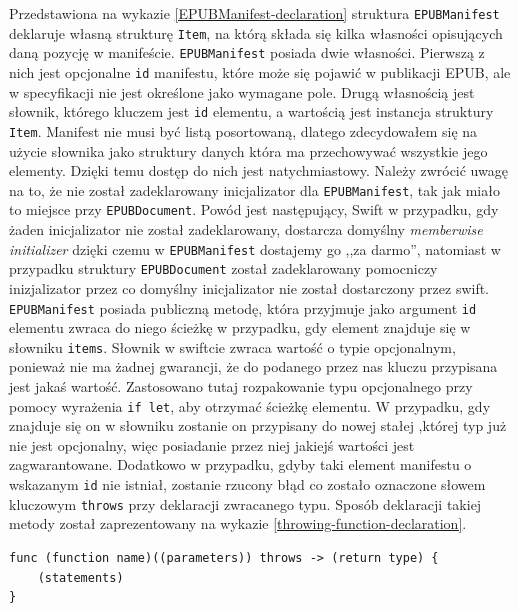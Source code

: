 Przedstawiona na wykazie \ref{EPUBManifest-declaration} struktura \texttt{EPUBManifest} deklaruje własną strukturę \texttt{Item}, na którą składa się kilka własności opisujących daną pozycję w manifeście. \texttt{EPUBManifest} posiada dwie własności. Pierwszą z nich jest opcjonalne \texttt{id} manifestu, które może się pojawić w publikacji EPUB, ale w specyfikacji nie jest określone jako wymagane pole. Drugą własnością jest słownik, którego kluczem jest \texttt{id} elementu, a wartością jest instancja struktury \texttt{Item}. Manifest nie musi być listą posortowaną, dlatego zdecydowałem się na użycie słownika jako struktury danych która ma przechowywać wszystkie jego elementy. Dzięki temu dostęp do nich jest natychmiastowy. Należy zwrócić uwagę na to, że nie został zadeklarowany inicjalizator dla \texttt{EPUBManifest}, tak jak miało to miejsce przy \texttt{EPUBDocument}. Powód jest następujący, Swift w przypadku, gdy żaden inicjalizator nie został zadeklarowany, dostarcza domyślny \textit{memberwise initializer} dzięki czemu w \texttt{EPUBManifest} dostajemy go ,,za darmo'', natomiast w przypadku struktury \texttt{EPUBDocument} został zadeklarowany pomocniczy inizjalizator przez co domyślny inicjalizator nie został dostarczony przez swift. \texttt{EPUBManifest} posiada publiczną metodę, która przyjmuje jako argument \texttt{id} elementu zwraca do niego ścieżkę w przypadku, gdy element znajduje się w słowniku \texttt{items}. Słownik w swiftcie zwraca wartość o typie opcjonalnym, ponieważ nie ma żadnej gwarancji, że do podanego przez nas kluczu przypisana jest jakaś wartość. Zastosowano tutaj rozpakowanie typu opcjonalnego przy pomocy wyrażenia \texttt{if let}, aby otrzymać ścieżkę elementu. W przypadku, gdy znajduje się on w słowniku zostanie on przypisany do nowej stałej ,której typ już nie jest opcjonalny, więc posiadanie przez niej jakiejś wartości jest zagwarantowane. Dodatkowo w przypadku, gdyby taki element manifestu o wskazanym \texttt{id} nie istniał, zostanie rzucony błąd co zostało oznaczone słowem kluczowym \texttt{throws} przy deklaracji zwracanego typu. Sposób deklaracji takiej metody został zaprezentowany na wykazie \ref{throwing-function-declaration}.

\begin{lstlisting}[caption={Funkcje i metody które mogą rzucać błędy, przy deklaracji muszą zostać oznaczone słowem kluczowym \texttt{throws}\cite{theSwiftProgrammingLanguage}},language=swift-reference,label=throwing-function-declaration]
func (function name)((parameters)) throws -> (return type) {
    (statements)
}
\end{lstlisting}

